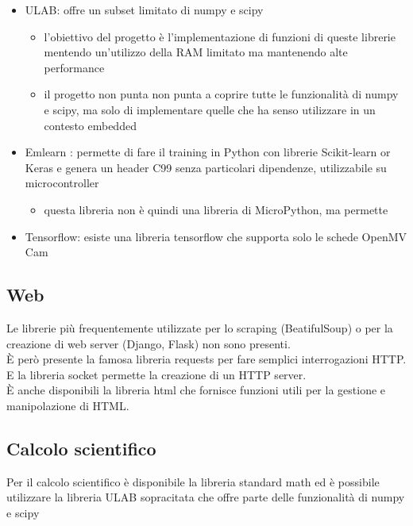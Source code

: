 \documentclass[12pt,a4paper]{report}
\begin{document}
\begin{itemize}
\item
  {ULAB}\cite{ulab}:
  offre un subset limitato di numpy e scipy

  \begin{itemize}
    \item
    l'obiettivo del progetto è
    l'implementazione di funzioni di queste librerie
    mentendo un'utilizzo della RAM limitato ma
    mantenendo alte performance
  \item
    il progetto non punta non punta a coprire tutte le funzionalità di
    numpy e scipy, ma solo di implementare quelle che ha senso
    utilizzare in un contesto embedded
  \end{itemize}
\item
  Emlearn \cite{emlearn}: permette di fare
  il training in Python con librerie Scikit-learn or Keras e genera un
  header C99 senza particolari dipendenze, utilizzabile su
  microcontroller

  \begin{itemize}
    \item
    questa libreria non è quindi una libreria di MicroPython, ma
    permette
  \end{itemize}
\item
  Tensorflow\cite{openmv_tensor}: esiste
  una libreria tensorflow che supporta solo le schede OpenMV Cam
\end{itemize}

\subsection{Web}\label{web}

Le librerie più frequentemente utilizzate per lo scraping (BeatifulSoup)
o per la creazione di web server (Django, Flask) non sono presenti.\\
È però presente la famosa libreria requests per fare semplici
interrogazioni HTTP. E la libreria socket permette la creazione di un
HTTP server.\\
È anche disponibili la libreria html che fornisce funzioni utili per la
gestione e manipolazione di HTML.

\subsection{Calcolo scientifico}\label{calcolo-scientifico}

Per il calcolo scientifico è disponibile la libreria standard math ed è
possibile utilizzare la libreria ULAB \cite{ulab}
sopracitata che offre parte delle funzionalità di numpy e scipy
\end{document}
